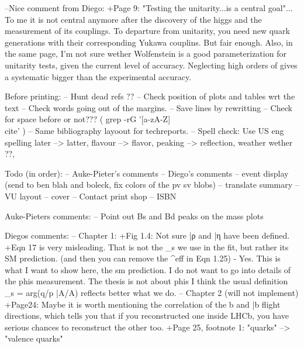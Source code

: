 --Nice comment from Diego: +Page 9: "Testing the unitarity...is a central goal"... To me it is not central anymore after the discovery
of the higgs and the measurement of its couplings. To departure from unitarity, you need new quark
generations with their corresponding Yukawa couplins. But fair enough.
 Also, in the same page, I'm not sure wether Wolfenstein is a good parameterization for unitarity tests,
given the current level of accuracy. Neglecting high orders of \lambda gives a systematic bigger than
the experimental accuracy.


Before printing:
-- Hunt dead refs ??
-- Check position of plots and tables wrt the text
-- Check words going out of the margins.
-- Save lines by rewritting
-- Check for space before \cite{} or not??? ( grep -rG  '[a-zA-Z]\\cite' )
-- Same bibliography layoout for techreports.
-- Spell check:  Use US eng spelling  later --> latter, flavour --> flavor, peaking --> reflection, weather wether ??,

Todo (in order):
-- Auke-Pieter's comments
-- Diego's comments
-- event display (send to ben blah and boleck, fix colors of the pv sv blobs)
-- translate summary
-- VU layout
-- cover
-- Contact print shop
-- ISBN

Auke-Pieters comments:
-- Point out Bs and Bd peaks on the mass plots

Diegos comments:
-- Chapter 1:
  +Fig 1.4: Not sure \bar{ρ} and \bar{η} have been defined.
  +Eqn 17 is very misleading. That is not the \phi_s we use in the fit, but rather its
          SM prediction. (and then you can remove the ^{eff} in Eqn 1.25)
  - Yes. This is what I want to show here, the sm prediction. I do not want to go into
          details of the phis measurement. The thesis is not about phis I think the usual definition \phi_s = arg(q/p \bar{A}/{A}) reflects better what we do.
-- Chapter 2 (will not implement)
  +Page24: Maybe it is worth mentioning the correlation of the b and \bar{b} flight directions,
           which tells you that if you reconstructed one inside LHCb, you have serious chances to reconstruct the other too.
  +Page 25, footnote 1: "quarks" --> "valence quarks"

